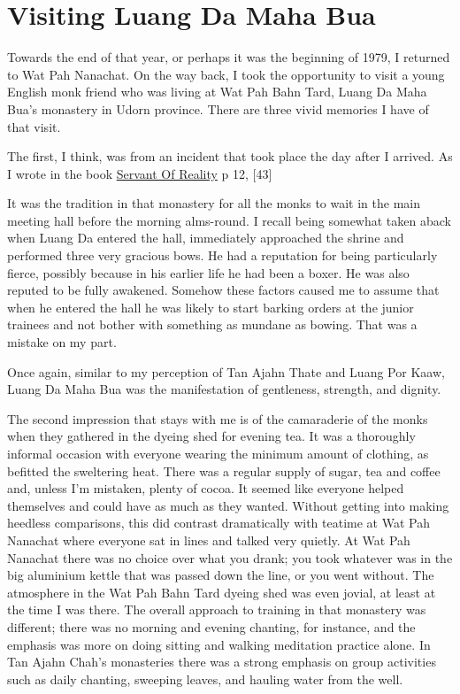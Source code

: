\chapter{Visiting Luang Da Maha Bua}

Towards the end of that year, or perhaps it was the beginning of 1979, I
returned to Wat Pah Nanachat. On the way back, I took the opportunity to
visit a young English monk friend who was living at Wat Pah Bahn Tard,
Luang Da Maha Bua's monastery in Udorn province. There are three vivid
memories I have of that visit.

The first, I think, was from an incident that took place the day after I
arrived. As I wrote in the book
\href{https://forestsangha.org/teachings/books/servant-of-reality?language=English}{Servant
Of Reality} p 12, {[}43{]}

It was the tradition in that monastery for all the monks to wait in the
main meeting hall before the morning alms-round. I recall being somewhat
taken aback when Luang Da entered the hall, immediately approached the
shrine and performed three very gracious bows. He had a reputation for
being particularly fierce, possibly because in his earlier life he had
been a boxer. He was also reputed to be fully awakened. Somehow these
factors caused me to assume that when he entered the hall he was likely
to start barking orders at the junior trainees and not bother with
something as mundane as bowing. That was a mistake on my part.

Once again, similar to my perception of Tan Ajahn Thate and Luang Por
Kaaw, Luang Da Maha Bua was the manifestation of gentleness, strength,
and dignity.

The second impression that stays with me is of the camaraderie of the
monks when they gathered in the dyeing shed for evening tea. It was a
thoroughly informal occasion with everyone wearing the minimum amount of
clothing, as befitted the sweltering heat. There was a regular supply of
sugar, tea and coffee and, unless I'm mistaken, plenty of cocoa. It
seemed like everyone helped themselves and could have as much as they
wanted. Without getting into making heedless comparisons, this did
contrast dramatically with teatime at Wat Pah Nanachat where everyone
sat in lines and talked very quietly. At Wat Pah Nanachat there was no
choice over what you drank; you took whatever was in the big aluminium
kettle that was passed down the line, or you went without. The
atmosphere in the Wat Pah Bahn Tard dyeing shed was even jovial, at
least at the time I was there. The overall approach to training in that
monastery was different; there was no morning and evening chanting, for
instance, and the emphasis was more on doing sitting and walking
meditation practice alone. In Tan Ajahn Chah's monasteries there was a
strong emphasis on group activities such as daily chanting, sweeping
leaves, and hauling water from the well.


